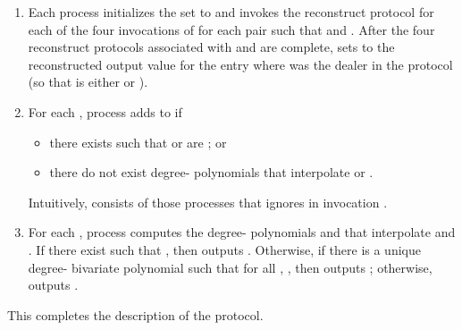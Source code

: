 \documentclass{sig-alternate}
\newcommand{\mwdavss}{\text{MW-SVSS}\xspace}
\newcommand{\davss}{{\text{SVSS}}\xspace}
\begin{document}
\begin{enumerate}
\item Each process
 initializes the set  to 
and invokes the reconstruct protocol 
for
each of the four invocations of \mwdavss for each
pair  such that  and
.
After the four reconstruct protocols associated with  and  are
complete,
 sets  to
    the reconstructed
    output value for the entry  where  was the dealer in the
\mwdavss protocol (so that  is either  or ).

\item For each , process  adds  to  if
\begin{itemize}
    \item there exists  such that  or  are ; or

    \item there do not exist degree- polynomials that interpolate
     or
    .
\end{itemize}
Intuitively,  consists of those processes that 
ignores in invocation .

\item For each , process  computes the
degree- polynomials  and 
 that interpolate   and .
If there exist  such that ,
then
 outputs .
Otherwise,
if there is  a
unique degree- bivariate polynomial 
  such that for all ,
  ,
then  outputs ; otherwise,  outputs .
\end{enumerate}

This completes the description of the \davss protocol.
\end{document}
